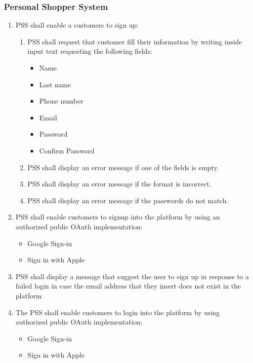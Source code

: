 \subsubsection{Personal Shopper System}
\begin{enumerate}[resume, label=SY-\arabic*]
    \item PSS shall enable a customers to sign up:
    \begin{enumerate}[label=SY-4.\arabic*]
        \item PSS shall request that customer fill their information by
        writing inside input text requesting the following fields:
        \begin{itemize}
            \item Name
            \item Last name
            \item Phone number
            \item Email
            \item Password
            \item Confirm Password
        \end{itemize}
        \item PSS shall display an error message if one of the fields is empty.
        \item PSS shall display an error message if the format is incorrect.
        \item PSS shall display an error message if the passwords do not match.
    \end{enumerate}
    \item PSS shall enable customers to signup into the platform by using an 
    authorized public OAuth implementation:
    \begin{itemize}
        \item Google Sign-in \cite{google-sign-in}
        \item Sign in with Apple \cite{sign-in-with-apple}
    \end{itemize}
    \item PSS shall display a message that suggest the user to sign up in
    response to a failed login in case the email address that they 
    insert does not exist in the platform
    \item The PSS shall enable customers to login into the platform by using 
    authorized public OAuth implementation:
    \begin{itemize}
        \item Google Sign-in \cite{google-sign-in}
        \item Sign in with Apple \cite{sign-in-with-apple}

\end{itemize}
\end{enumerate}
